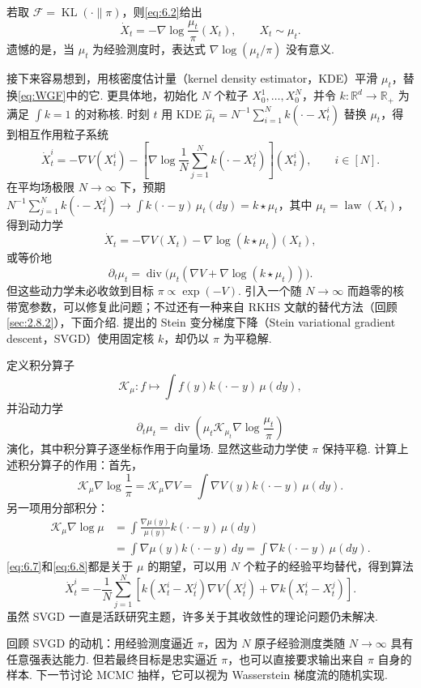 若取 $\mathcal F=\operatorname{KL}(\cdot\|\pi)$，则\eqref{eq:6.2}给出
\begin{equation}\tag{WGF}\label{eq:WGF}
\dot X_t=-\nabla\log\frac{\mu_t}\pi(X_t),\qquad X_t\sim\mu_t.
\end{equation}
遗憾的是，当 $\mu_t$ 为经验测度时，表达式 $\nabla\log(\mu_t/\pi)$ 没有意义.

接下来容易想到，用核密度估计量（kernel density estimator，KDE）平滑 $\mu_t$，替换\eqref{eq:WGF}中的它. 更具体地，初始化 $N$ 个粒子 $X_0^1,\ldots,X_0^N$，并令 $k:\mathbb R^d\to\mathbb R_+$ 为满足 $\int k=1$ 的对称核. 时刻 $t$ 用 KDE $\widehat\mu_t=N^{-1}\sum_{i=1}^Nk(\cdot-X_t^i)$ 替换 $\mu_t$，得到相互作用粒子系统
$$
\dot X_t^i=-\nabla V(X_t^i)
-\left[\nabla\log\frac1N\sum_{j=1}^Nk(\cdot-X_t^j)\right](X_t^i),
\qquad i\in[N].
$$
在平均场极限 $N\to\infty$ 下，预期 $N^{-1}\sum_{j=1}^Nk(\cdot-X_t^j)\to\int k(\cdot-y)\,\mu_t(dy)=k\star\mu_t$，其中 $\mu_t=\operatorname{law}(X_t)$，得到动力学
$$
\dot X_t=-\nabla V(X_t)-\nabla\log(k\star\mu_t)(X_t),
$$
或等价地
$$
\partial_t\mu_t=\operatorname{div}\bigl(\mu_t(\nabla V+\nabla\log(k\star\mu_t))\bigr).
$$
但这些动力学未必收敛到目标 $\pi\propto\exp(-V)$. 引入一个随 $N\to\infty$ 而趋零的核带宽参数，可以修复此问题；不过还有一种来自 RKHS 文献的替代方法（回顾\autoref{sec:2.8.2}），下面介绍. \cite{ref213}提出的 Stein 变分梯度下降（Stein variational gradient descent，SVGD）使用固定核 $k$，却仍以 $\pi$ 为平稳解.

定义积分算子
$$
\mathcal K_\mu:f\mapsto\int f(y)k(\cdot-y)\,\mu(dy),
$$
并沿动力学
\begin{equation}\tag{SVGD}\label{eq:SVGD}
\partial_t\mu_t=\operatorname{div}\left(\mu_t\mathcal K_{\mu_t}\nabla\log\frac{\mu_t}\pi\right)
\end{equation}
演化，其中积分算子逐坐标作用于向量场. 显然这些动力学使 $\pi$ 保持平稳. 计算上述积分算子的作用：首先，
\begin{equation}\label{eq:6.7}
\mathcal K_\mu\nabla\log\frac1\pi
=\mathcal K_\mu\nabla V=\int\nabla V(y)k(\cdot-y)\,\mu(dy).
\end{equation}
另一项用分部积分：
\begin{equation}\label{eq:6.8}
\begin{aligned}
\mathcal K_\mu\nabla\log\mu
&=\int\frac{\nabla\mu(y)}{\mu(y)}k(\cdot-y)\,\mu(dy)\\
&=\int\nabla\mu(y)k(\cdot-y)\,dy
=\int\nabla k(\cdot-y)\,\mu(dy).
\end{aligned}
\end{equation}
\eqref{eq:6.7}和\eqref{eq:6.8}都是关于 $\mu$ 的期望，可以用 $N$ 个粒子的经验平均替代，得到算法
$$
\dot X_t^i=-\frac1N\sum_{j=1}^N
\left[k(X_t^i-X_t^j)\nabla V(X_t^j)+\nabla k(X_t^i-X_t^j)\right].
$$
虽然 SVGD 一直是活跃研究主题，许多关于其收敛性的理论问题仍未解决.

回顾 SVGD 的动机：用经验测度逼近 $\pi$，因为 $N$ 原子经验测度类随 $N\to\infty$ 具有任意强表达能力. 但若最终目标是忠实逼近 $\pi$，也可以直接要求输出来自 $\pi$ 自身的样本. 下一节讨论 MCMC 抽样，它可以视为 Wasserstein 梯度流的随机实现.
